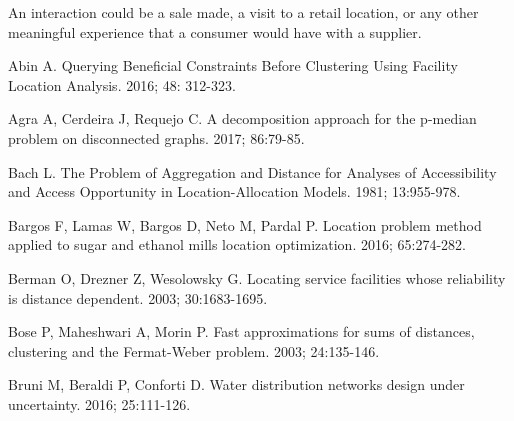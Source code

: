\documentclass[twoside,twocolumn]{article}
\begin{document}



An interaction could be a sale made, a visit to a retail location, or any other meaningful experience that a consumer would have with a supplier. %



\begin{thebibliography}{99}

Abin A.
\newblock Querying Beneficial Constraints Before Clustering Using Facility Location Analysis.
 2016; 48: 312-323.

Agra A, Cerdeira J, Requejo C.
\newblock A decomposition approach for the p-median problem on disconnected graphs.
 2017; 86:79-85.

Bach L.
\newblock The Problem of Aggregation and Distance for Analyses of Accessibility and Access Opportunity in Location-Allocation Models.
 1981; 13:955-978.

Bargos F, Lamas W, Bargos D, Neto M, Pardal P.
\newblock Location problem method applied to sugar and ethanol mills location optimization.
 2016; 65:274-282.

Berman O, Drezner Z, Wesolowsky G.
\newblock Locating service facilities whose reliability is distance dependent.
 2003; 30:1683-1695.

Bose P, Maheshwari A, Morin P.
\newblock Fast approximations for sums of distances, clustering and the Fermat-Weber problem.
 2003; 24:135-146.

Bruni M, Beraldi P, Conforti D.
\newblock Water distribution networks design under uncertainty.
 2016; 25:111-126.


\end{thebibliography}
\end{document}
